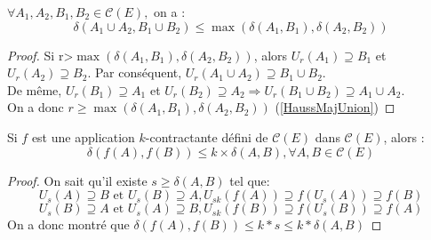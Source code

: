 \documentclass[a4paper, 12pt]{report}
\begin{document}
			\begin{lemma}
				\label{lemme118}
				$\forall A_1,A_2,B_1,B_2\in\mathcal{C}(E),$ on a :
				\begin{equation}
					\label{HaussMajUnion}
					\delta(A_1\cup A_2 , B_1\cup B_2)\leq \max(\delta(A_1,B_1), \delta(A_2,B_2))
				\end{equation}
			\end{lemma}
		
			\begin{proof}
				Si r>$\max(\delta(A_1,B_1), \delta(A_2,B_2))$, alors $U_r(A_1)\supseteq B_1$ et $U_r(A_2)\supseteq B_2$. Par conséquent, $U_r(A_1\cup A_2)\supseteq B_1\cup B_2$.\\
				De même, $U_r(B_1)\supseteq A_1$ et $U_r(B_2)\supseteq A_2\Longrightarrow U_r(B_1\cup B_2)\supseteq A_1\cup A_2$.\\
				On a donc $r\geq \max(\delta(A_1,B_1), \delta(A_2,B_2)) $ (\ref{HaussMajUnion})
			\end{proof}

			\begin{lemma}
			\label{lemme119}
				Si $f$ est une application $k$-contractante défini de $\mathcal{C}(E)$ dans $\mathcal{C}(E)$, alors :
				\begin{equation}
					\delta(f(A),f(B))\leq k\times \delta(A,B),\forall A,B\in\mathcal{C}(E)
				\end{equation}
			\end{lemma}
			
			\begin{proof}
				On sait qu'il existe $s\geq\delta(A,B)$ tel que:
				\begin{equation*}
					U_s(A)\supseteq B \textrm{ et } U_s(B)\supseteq A,  U_{sk}(f(A))\supseteq f(U_s(A))\supseteq f(B)					
				\end{equation*}
				\begin{equation*}
					U_s(B)\supseteq A \textrm{ et } U_s(A)\supseteq B,  U_{sk}(f(B))\supseteq f(U_s(B))\supseteq f(A)
				\end{equation*}
				On a donc montré que $\delta(f(A),f(B))\leq k*s\leq k*\delta(A,B)$

			\end{proof}
\end{document}
